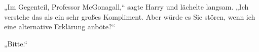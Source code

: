 „Im Gegenteil, Professor McGonagall,“ sagte Harry und lächelte langsam. „Ich verstehe das als ein sehr großes Kompliment. Aber würde es Sie stören, wenn ich eine alternative Erklärung anböte?“

„Bitte.“


